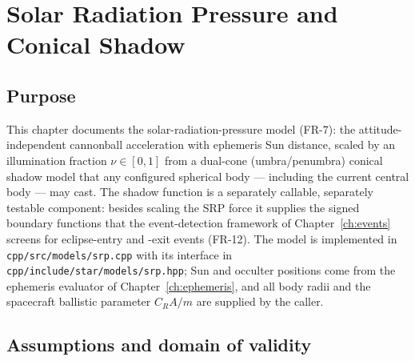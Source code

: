 \chapter{Solar Radiation Pressure and Conical Shadow}
\label{ch:srp}

\section{Purpose}
\label{sec:srp:purpose}

This chapter documents the solar-radiation-pressure model (FR-7): the
attitude-independent cannonball acceleration with ephemeris Sun distance,
scaled by an illumination fraction $\nu \in [0, 1]$ from a dual-cone
(umbra/penumbra) conical shadow model that any configured spherical body
--- including the current central body --- may cast. The shadow function
is a separately callable, separately testable component: besides scaling
the SRP force it supplies the signed boundary functions that the
event-detection framework of Chapter~\ref{ch:events} screens for
eclipse-entry and -exit events (FR-12). The model is implemented in
\texttt{cpp/src/models/srp.cpp} with its interface in
\texttt{cpp/include/star/models/srp.hpp}; Sun and occulter positions come
from the ephemeris evaluator of Chapter~\ref{ch:ephemeris}, and all body
radii and the spacecraft ballistic parameter $C_R A / m$ are supplied by
the caller.

\section{Assumptions and domain of validity}
\label{sec:srp:domain}

